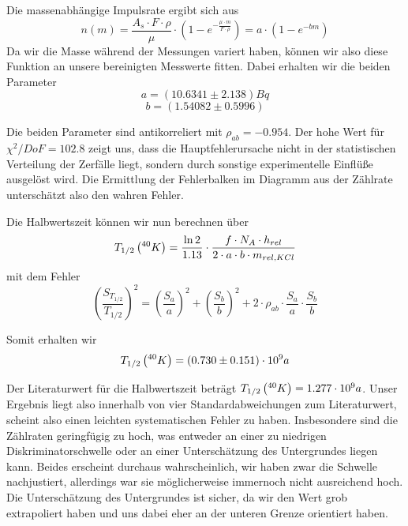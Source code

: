Die massenabhängige Impulsrate ergibt sich aus
\begin{equation}
 n(m) = \frac{A_s \cdot F \cdot \rho}{\mu} \cdot \left( 1 - e^{-\frac{\mu \cdot m}{F \cdot \rho}} \right) = a \cdot \left( 1 - e^{-bm} \right)
\end{equation}
Da wir die Masse während der Messungen variert haben, können wir also diese Funktion an unsere bereinigten Messwerte fitten. Dabei erhalten wir die beiden Parameter
$$ a = (10.6341 \pm 2.138) Bq $$
$$ b = (1.54082 \pm  0.5996) $$

Die beiden Parameter sind antikorreliert mit $\rho_{ab} = -0.954$. Der hohe Wert für $\chi^2/DoF = 102.8$ zeigt uns, dass die Hauptfehlerursache nicht in der statistischen Verteilung der Zerfälle liegt, sondern durch sonstige experimentelle Einflüße ausgelöst wird. Die Ermittlung der Fehlerbalken im Diagramm aus der Zählrate unterschätzt also den wahren Fehler. 

Die Halbwertszeit können wir nun berechnen über
\begin{equation}
 T_{1/2}\left( ^{40}_{}{K} \right) = \frac{\ln 2}{1.13} \cdot \frac{f \cdot N_A \cdot h_{rel}}{2 \cdot a \cdot b \cdot m_{rel,KCl}}
\end{equation}
mit dem Fehler
\begin{equation}
 \left( \frac{S_{T_{1/2}}}{T_{1/2}} \right)^2 = \left( \frac{S_a}{a} \right)^2 + \left( \frac{S_b}{b} \right)^2 + 2 \cdot \rho_{ab} \cdot \frac{S_a}{a} \cdot \frac{S_b}{b}
\end{equation}

Somit erhalten wir $$T_{1/2} \left( ^{40}_{}{K} \right) = ( 0.730 \pm 0.151 ) \cdot 10^9 a$$

Der Literaturwert für die Halbwertszeit beträgt $T_{1/2} \left( ^{40}_{}{K} \right) = 1.277 \cdot 10^9 a$. Unser Ergebnis liegt also innerhalb von vier Standardabweichungen zum Literaturwert, scheint also einen leichten systematischen Fehler zu haben. Insbesondere sind die Zählraten geringfügig zu hoch, was entweder an einer zu niedrigen Diskriminatorschwelle oder an einer Unterschätzung des Untergrundes liegen kann. Beides erscheint durchaus wahrscheinlich, wir haben zwar die Schwelle nachjustiert, allerdings war sie möglicherweise immernoch nicht ausreichend hoch. Die Unterschätzung des Untergrundes ist sicher, da wir den Wert grob extrapoliert haben und uns dabei eher an der unteren Grenze orientiert haben. 